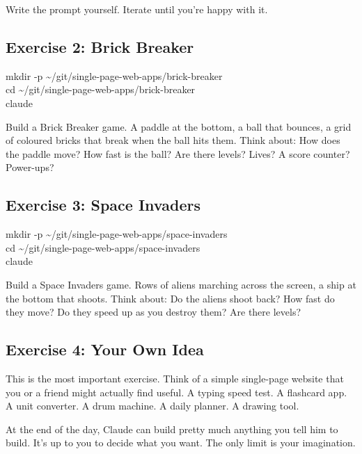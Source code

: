 \documentclass[11pt,a4paper]{article}
\begin{document}
Write the prompt yourself. Iterate until you're happy with it.

\subsection{Exercise 2: Brick Breaker}

\begin{tcolorbox}[termbox]
mkdir -p \textasciitilde/git/single-page-web-apps/brick-breaker\\
cd \textasciitilde/git/single-page-web-apps/brick-breaker\\
claude
\end{tcolorbox}

Build a Brick Breaker game. A paddle at the bottom, a ball that bounces, a grid of coloured bricks that break when the ball hits them. Think about: How does the paddle move? How fast is the ball? Are there levels? Lives? A score counter? Power-ups?

\subsection{Exercise 3: Space Invaders}

\begin{tcolorbox}[termbox]
mkdir -p \textasciitilde/git/single-page-web-apps/space-invaders\\
cd \textasciitilde/git/single-page-web-apps/space-invaders\\
claude
\end{tcolorbox}

Build a Space Invaders game. Rows of aliens marching across the screen, a ship at the bottom that shoots. Think about: Do the aliens shoot back? How fast do they move? Do they speed up as you destroy them? Are there levels?

\subsection{Exercise 4: Your Own Idea}

This is the most important exercise. Think of a simple single-page website that you or a friend might actually find useful. A typing speed test. A flashcard app. A unit converter. A drum machine. A daily planner. A drawing tool.

At the end of the day, Claude can build pretty much anything you tell him to build. It's up to you to decide what you want. The only limit is your imagination.
\end{document}
